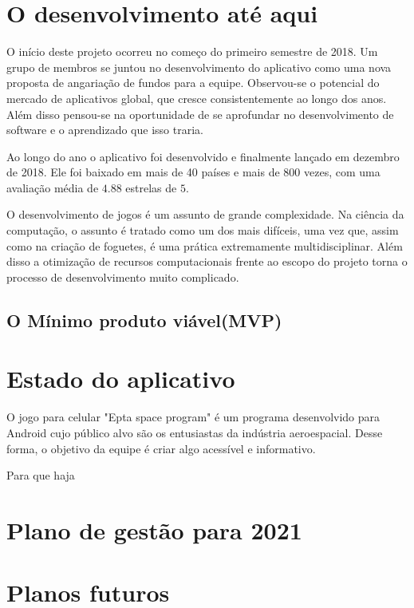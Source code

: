 \tableofcontents          %
\thispagestyle{empty}     %
\listoffigures            %
\thispagestyle{empty}     %
\mainmatter

\chapter{O desenvolvimento até aqui}

    O início deste projeto ocorreu no começo do primeiro semestre de 2018. Um grupo de membros se juntou no desenvolvimento do aplicativo como uma nova proposta de angariação de fundos para a equipe. 
    Observou-se o potencial do mercado de aplicativos global, que cresce consistentemente ao longo dos anos.
    Além disso pensou-se na oportunidade de se aprofundar no desenvolvimento de software e o aprendizado que isso traria.

    Ao longo do ano o aplicativo foi desenvolvido e finalmente lançado em dezembro de 2018. Ele foi baixado em mais de 40 países e mais de 800 vezes, com uma avaliação média de $4.88$ estrelas de $5$. 


    O desenvolvimento de jogos é um assunto de grande complexidade. 
    Na ciência da computação, o assunto é tratado como um dos mais difíceis, uma vez que, assim como na criação de foguetes, é uma prática extremamente multidisciplinar.
    Além disso a otimização de recursos computacionais frente ao escopo do projeto torna o processo de desenvolvimento muito complicado.

\section{O Mínimo produto viável(MVP)}

\chapter{Estado do aplicativo}

    O jogo para celular "Epta space program" é um programa desenvolvido para Android cujo público alvo são os entusiastas da indústria aeroespacial. Desse forma, o objetivo da equipe é criar algo acessível e informativo.

    Para que haja 

\chapter{Plano de gestão para 2021}

\chapter{Planos futuros}



% 
% 




